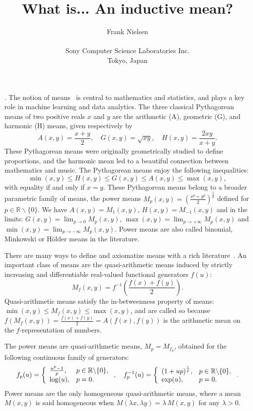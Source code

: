 \documentclass{article}
\def\bbR{\mathbb{R}}
\begin{document}
\title{What is... An inductive mean?}

\author{Frank Nielsen\\ \ \\ Sony Computer Science Laboratories Inc.\\ Tokyo, Japan}

\date{}

\maketitle

. 
The notion of means~\cite{de2016mean} is central to mathematics and statistics, and  plays a key role in machine learning and data analytics.  
The three classical Pythagorean means of two positive reals $x$ and $y$ are the arithmetic  (A), geometric  (G), 
and  harmonic (H) means, given respectively by
$$
A(x,y) = \frac{x+y}{2},\quad
G(x,y) = \sqrt{xy},\quad
H(x,y) = \frac{2xy}{x+y}.
$$
These  Pythagorean means were originally geometrically studied to define proportions, and the harmonic mean 
led to a beautiful connection between mathematics and music.
The Pythagorean means enjoy the following inequalities:
$$
\min(x,y)\leq H(x,y)\leq G(x,y)\leq A(x,y)\leq \max(x,y),
$$
with equality if and only if $x=y$.
These Pythagorean means belong to a broader parametric family of means, the power means $M_p(x,y)=\left(\frac{x^p+y^p}{2}\right)^\frac{1}{p}$ 
defined for $p\in\bbR\backslash\{0\}$.
We have $A(x,y)=M_1(x,y)$, $H(x,y)=M_{-1}(x,y)$ and in the limits: $G(x,y)=\lim_{p\rightarrow 0} M_p(x,y)$, 
$\max(x,y)=\lim_{p\rightarrow+\infty} M_p(x,y)$ and 
$\min(x,y)=\lim_{p\rightarrow-\infty} M_p(x,y)$.
Power means are also called binomial, Minkowski or H\"older means in the literature.

There are many ways to define and axiomatize means with a rich literature~\cite{bullen2003handbook}.
An important class of means are the quasi-arithmetic means induced by strictly increasing and differentiable real-valued functional generators $f(u)$:
\begin{equation}\label{eq:qam}
M_f(x,y)=f^{-1}\left(\frac{f(x)+f(y)}{2}\right).
\end{equation}
Quasi-arithmetic means satisfy the in-betweenness property of means: 
$\min(x,y)\leq M_f(x,y)\leq \max(x,y)$, and are called so because $f(M_f(x,y))=\frac{f(x)+f(y)}{2}=A(f(x),f(y))$ is the arithmetic mean on the $f$-representation of numbers.

The power means  are quasi-arithmetic means, $M_p=M_{f_p}$, obtained for the following continuous family of generators:
$$
f_p(u)=
\left\{
\begin{array}{ll}
\frac{u^p-1}{p}, & p\in\bbR\backslash\{0\},\cr
\log(u), & p=0.
\end{array}
\right., \quad
f_p^{-1}(u)=
\left\{
\begin{array}{ll}
(1+up)^{\frac{1}{p}}, & p\in\bbR\backslash\{0\},\cr
\exp(u), & p=0.
\end{array}
\right..
$$
Power means are the only homogeneous quasi-arithmetic means, where a mean $M(x,y)$ is said homogeneous when $M(\lambda x,\lambda y)=\lambda\, M(x,y)$ for any $\lambda>0$.   
\end{document}
